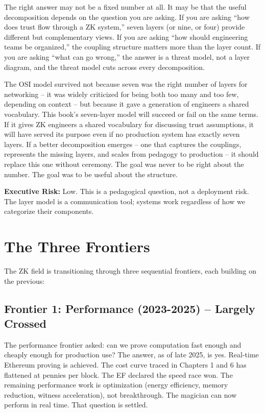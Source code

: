 \documentclass[
  11pt,
  openany]{report}
\renewcommand{\textbf}[1]{{\bfseries\color{MidnightBold}#1}}
\begin{document}
The right answer may not be a fixed number at all. It may be that the useful
decomposition depends on the question you are asking. If you are asking ``how
does trust flow through a ZK system,'' seven layers (or nine, or four) provide
different but complementary views. If you are asking ``how should engineering
teams be organized,'' the coupling structure matters more than the layer count.
If you are asking ``what can go wrong,'' the answer is a threat model, not a
layer diagram, and the threat model cuts across every decomposition.

The OSI model survived not because seven was the right number of layers for
networking -- it was widely criticized for being both too many and too few,
depending on context -- but because it gave a generation of engineers a shared
vocabulary. This book's seven-layer model will succeed or fail on the same
terms. If it gives ZK engineers a shared vocabulary for discussing trust
assumptions, it will have served its purpose even if no production system has
exactly seven layers. If a better decomposition emerges -- one that captures the
couplings, represents the missing layers, and scales from pedagogy to production
-- it should replace this one without ceremony. The goal was never to be right
about the number. The goal was to be useful about the structure.

\textbf{Executive Risk:} Low. This is a pedagogical question, not a deployment
risk. The layer model is a communication tool; systems work regardless of how we
categorize their components.

\section{The Three Frontiers}\label{the-three-frontiers}

The ZK field is transitioning through three sequential frontiers, each building
on the previous:

\subsection{Frontier 1: Performance (2023-2025) -- Largely
Crossed}\label{frontier-1-performance-2023-2025-largely-crossed}

The performance frontier asked: can we prove computation fast enough and cheaply
enough for production use? The answer, as of late 2025, is yes. Real-time
Ethereum proving is achieved. The cost curve traced in Chapters 1 and 6 has
flattened at pennies per block. The EF declared the speed race won. The
remaining performance work is optimization (energy efficiency, memory reduction,
witness acceleration), not breakthrough. The magician can now perform in real
time. That question is settled.
\end{document}
